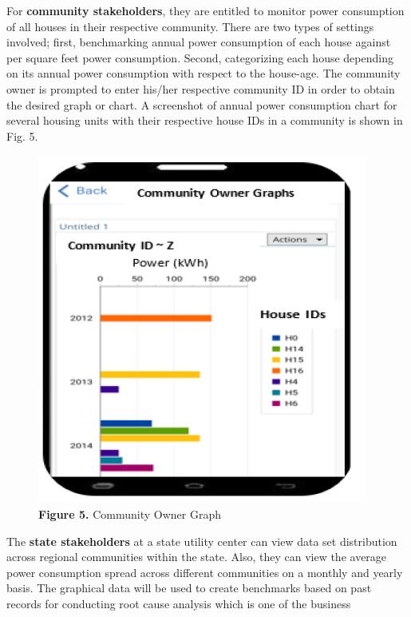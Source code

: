 \documentclass[a4paper,12pt,oneside]{article}
\let\counterwithin\relax
\begin{document}
\begin{itemize}
\begin{figure}[H]
        \end{figure}
    \newpage
    For \textbf{community stakeholders}, they are entitled to
    monitor power consumption of all houses in their respective
    community. There are two types of settings involved; first,
    benchmarking annual power consumption of each house
    against per square feet power consumption. Second,
    categorizing each house depending on its annual power
    consumption with respect to the house-age. The community
    owner is prompted to enter his/her respective community ID in
    order to obtain the desired graph or chart. A screenshot of
    annual power consumption chart for several housing units
    with their respective house IDs in a community is shown in
    Fig. 5.
    \newline
        \begin{figure}[H]
        \includegraphics{Figure5.png}
        \centering
        \caption[Community Owner Graph]{\textbf{Figure 5.} Community Owner Graph}
        \end{figure}
    \newpage
    The \textbf{state stakeholders} at a state utility center can view data set distribution across
    regional communities within the state. Also, they can view the
    average power consumption spread across different
    communities on a monthly and yearly basis. The graphical
    data will be used to create benchmarks based on past records
    for conducting root cause analysis which is one of the business

\end{itemize}
\end{document}
